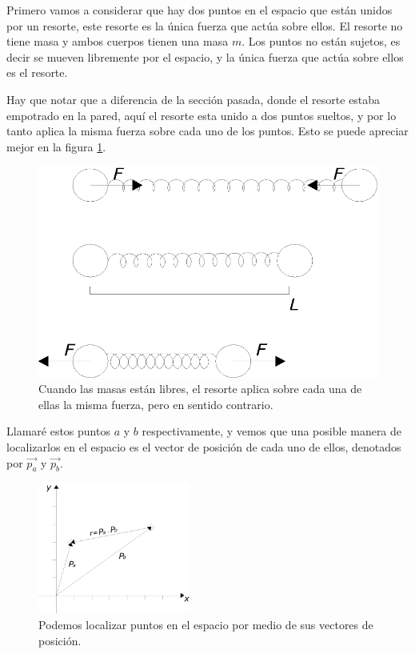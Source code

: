 Primero vamos a considerar que hay dos puntos en el espacio que están unidos por un resorte, este resorte es la única fuerza que actúa sobre ellos. El resorte no tiene masa y ambos cuerpos tienen una masa $m$. Los puntos no están sujetos, es decir se mueven libremente por el espacio, y la única fuerza que actúa sobre ellos es el resorte.

Hay que notar que a diferencia de la sección pasada, donde el resorte estaba empotrado en la pared, aquí el resorte esta unido a dos puntos sueltos, y por lo tanto aplica la misma fuerza sobre cada uno de los puntos. Esto se puede apreciar mejor en la figura \ref{masaSuelta:fig}.

\begin{figure}
 \centering
 \includegraphics[]{Img/masa_suelta}
 \caption[Masas libres en el espacio unidas por un resorte]{ 
 Cuando las masas están libres, el resorte aplica sobre cada una de ellas la misma fuerza, pero en sentido contrario.
 } \label{masaSuelta:fig}
\end{figure}

Llamaré estos puntos $a$ y $b$ respectivamente, y vemos que una posible manera de localizarlos en el espacio es el vector de posición de cada uno de ellos, denotados por $\vec{p_a}$ y $\vec{p_b}$.

\begin{figure}
 \centering
 \includegraphics[width=5cm]{Img/vector_posicion}
 \caption[Ejemplo de vectores de posición]{ 
 Podemos localizar puntos en el espacio por medio de sus vectores de posición.
 } \label{posVec:fig}
\end{figure}


